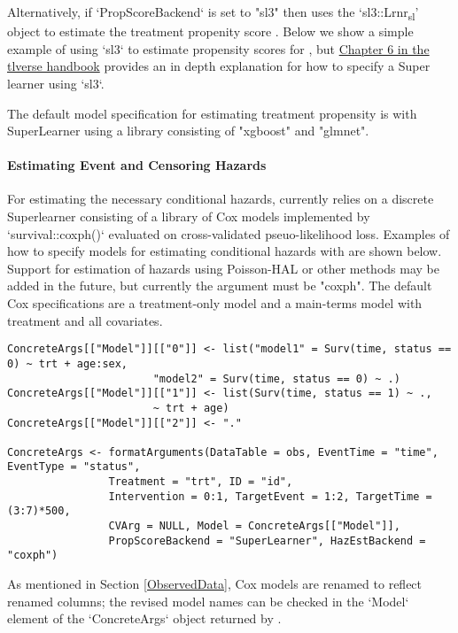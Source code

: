 \documentclass{report}
\newcommand{\1}{\ensuremath{\mathbf{1}}}
\begin{document}
Alternatively, if `PropScoreBackend` is set to "sl3" then  uses the `sl3::Lrnr\textsubscript{sl}' object to estimate the treatment propenity score . Below we show a simple example of using `sl3` to estimate propensity scores for , but  \href{https://tlverse.org/tlverse-handbook/sl3.html}{Chapter 6 in the tlverse handbook} provides an in depth explanation for how to specify a Super learner using `sl3`.

The default model specification for estimating treatment propensity is with SuperLearner using a library consisting of "xgboost" and "glmnet".

\paragraph{Estimating Event and Censoring Hazards}
\label{HazardEstimation}
For estimating the necessary conditional hazards,  currently relies on a discrete Superlearner consisting of a library of Cox models implemented by `survival::coxph()` evaluated on cross-validated pseuo-likelihood loss. Examples of how to specify models for estimating conditional hazards with  are shown below. Support for estimation of hazards using Poisson-HAL or other methods may be added in the future, but currently the  argument must be "coxph". The default Cox specifications are a treatment-only model and a main-terms model with treatment and all covariates.  

\begin{lstlisting}
ConcreteArgs[["Model"]][["0"]] <- list("model1" = Surv(time, status == 0) ~ trt + age:sex,
				       "model2" = Surv(time, status == 0) ~ .)
ConcreteArgs[["Model"]][["1"]] <- list(Surv(time, status == 1) ~ ., 
				       ~ trt + age)
ConcreteArgs[["Model"]][["2"]] <- "."

ConcreteArgs <- formatArguments(DataTable = obs, EventTime = "time", EventType = "status", 
				Treatment = "trt", ID = "id", 
				Intervention = 0:1, TargetEvent = 1:2, TargetTime = (3:7)*500, 
				CVArg = NULL, Model = ConcreteArgs[["Model"]], 
				PropScoreBackend = "SuperLearner", HazEstBackend = "coxph")
\end{lstlisting}

As mentioned in Section \ref{ObservedData}, Cox models are renamed to reflect renamed columns; the revised model names can be checked in the `Model` element of the `ConcreteArgs` object returned by .
\end{document}
